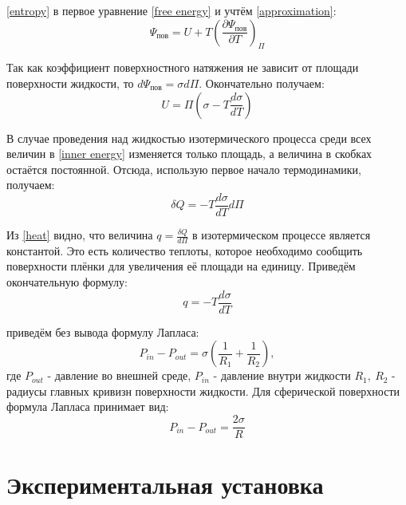 \documentclass[15pt,a5paper,reqno]{article}
\begin{document}
     \eqref{entropy} в первое уравнение \eqref{free energy} и учтём \eqref{approximation}:
    \begin{equation}
        \Psi_{\text{пов}} = U + T\left(\frac{\partial\Psi_{\text{пов}}}{\partial T}\right)_{\Pi}
    \end{equation}
    
    Так как коэффициент поверхностного натяжения не зависит от площади поверхности жидкости, то $d\Psi_{\text{пов}} = \sigma d\Pi$. Окончательно получаем:
    \begin{equation}\label{inner energy}
        \boxed{U = \Pi\left(\sigma - T\frac{d\sigma}{dT}\right)}
    \end{equation}
    
    В случае проведения над жидкостью изотермического процесса среди всех величин в \eqref{inner energy} изменяется только площадь, а величина в скобках остаётся постоянной. Отсюда, использую первое начало термодинамики, получаем:
    \begin{equation}\label{heat}
        \delta Q = -T\frac{d\sigma}{dT}d\Pi
    \end{equation}
    
    Из \eqref{heat} видно, что величина $q = \frac{\delta Q}{d\Pi}$ в изотермическом процессе является константой. Это есть количество теплоты, которое необходимо сообщить поверхности плёнки для увеличения её площади на единицу. Приведём окончательную формулу:
    \begin{equation}
        \boxed{q = -T\frac{d\sigma}{dT}}
    \end{equation}
    
     приведём без вывода формулу Лапласа:
    \begin{equation}
        P_{in} - P_{out} = \sigma\left(\frac{1}{R_1} + \frac{1}{R_2}\right),
    \end{equation}
    где $P_{out}$ - давление во внешней среде, $P_{in}$ - давление внутри жидкости $R_1,\ R_2$ - радиусы главных кривизн поверхности жидкости. Для сферической поверхности формула Лапласа принимает вид:
    \begin{equation}\label{Laplas}
        \boxed{P_{in} - P_{out} = \frac{2\sigma}{R}}
    \end{equation}

\section{Экспериментальная установка}
\end{document}
